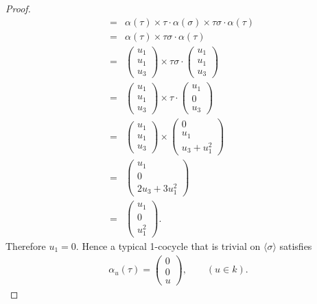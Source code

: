 \begin{proof}
\begin{eqnarray*}
		&=& \alpha(\tau) \times \tau\cdot\alpha(\sigma) \times \tau\sigma\cdot\alpha(\tau) \\
		&=& \alpha(\tau) \times \tau\sigma\cdot\alpha(\tau) \\
		&=& \left(\begin{matrix} u_1 \\ u_1 \\ u_3\end{matrix} \right) \times
		\tau\sigma\cdot\left(\begin{matrix} u_1 \\ u_1 \\ u_3\end{matrix} \right)\\
		&=& \left(\begin{matrix} u_1 \\ u_1 \\ u_3\end{matrix} \right) \times
		\tau\cdot\left(\begin{matrix} u_1 \\ 0 \\ u_3\end{matrix} \right)\\
		&=& \left(\begin{matrix} u_1 \\ u_1 \\ u_3\end{matrix} \right) \times
		\left(\begin{matrix} 0 \\ u_1 \\ u_3 + u_1^2\end{matrix} \right)\\
		&=& \left(\begin{matrix} u_1 \\ 0 \\ 2u_3 + 3u_1^2\end{matrix} \right)\\
		&=& \left(\begin{matrix} u_1 \\ 0 \\ u_1^2\end{matrix} \right).
	\end{eqnarray*}
	Therefore $u_1 = 0$. Hence a typical 1-cocycle that is trivial on $\langle \sigma \rangle$ satisfies
	\begin{eqnarray*}
		\alpha_u(\tau) = \left(\begin{matrix} 0 \\ 0 \\ u \end{matrix} \right),\qquad (u\in k).

\end{eqnarray*}
\end{proof}
